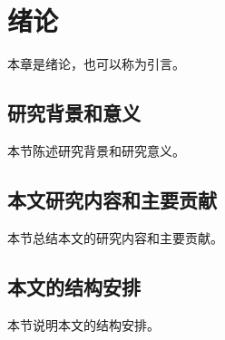\chapter{绪论}
本章是绪论，也可以称为引言。

\section{研究背景和意义}
本节陈述研究背景和研究意义。

\section{本文研究内容和主要贡献}
本节总结本文的研究内容和主要贡献。

\section{本文的结构安排}
本节说明本文的结构安排。